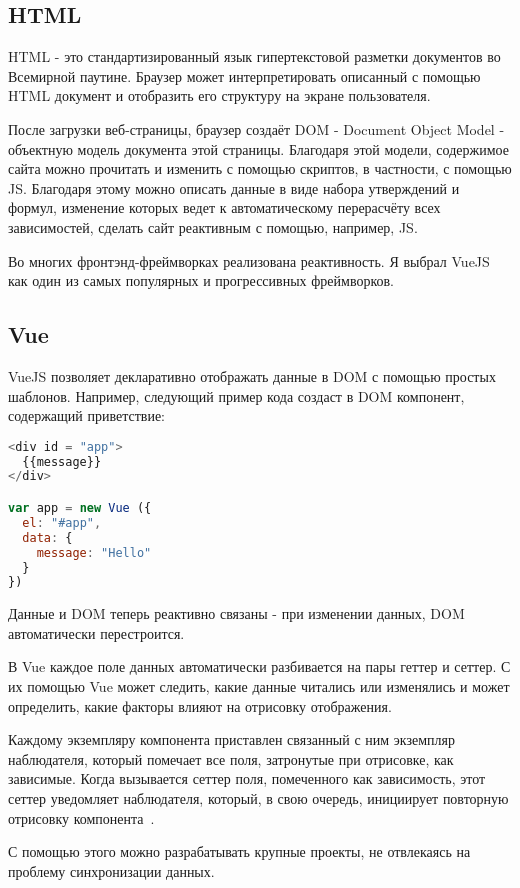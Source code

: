 \subsection{HTML}

HTML - это стандартизированный язык гипертекстовой разметки документов во Всемирной паутине. Браузер может интерпретировать описанный с помощью HTML документ и отобразить его структуру на экране пользователя.

После загрузки веб-страницы, браузер создаёт DOM - Document Object Model - объектную модель документа этой страницы. Благодаря этой модели, содержимое сайта можно прочитать и изменить с помощью скриптов, в частности, с помощью JS.
Благодаря этому можно описать данные в виде набора утверждений и формул, изменение которых ведет к автоматическому перерасчёту всех зависимостей, сделать сайт реактивным с помощью, например, JS.

Во многих фронтэнд-фреймворках реализована реактивность. Я выбрал VueJS как один из самых популярных и прогрессивных фреймворков.

\subsection{Vue}

VueJS  позволяет декларативно отображать данные в DOM с помощью простых шаблонов. Например, следующий пример кода создаст в DOM компонент, содержащий приветствие:

\begin{lstlisting}[language=JavaScript]
<div id = "app">
  {{message}}
</div>

var app = new Vue ({
  el: "#app",
  data: {
    message: "Hello"
  }
})
\end{lstlisting}

Данные и DOM теперь реактивно связаны - при изменении данных, DOM автоматически перестроится.

В Vue каждое поле данных автоматически разбивается на пары геттер и сеттер. С их помощью Vue может следить, какие данные читались или изменялись и может определить, какие факторы влияют на отрисовку отображения.

Каждому экземпляру компонента приставлен связанный с ним экземпляр наблюдателя, который помечает все поля, затронутые при отрисовке, как зависимые. Когда вызывается сеттер поля, помеченного как зависимость, этот сеттер уведомляет наблюдателя, который, в свою очередь, инициирует повторную отрисовку компонента~\cite{vue}.

С помощью этого можно разрабатывать крупные проекты, не отвлекаясь на проблему синхронизации данных.


